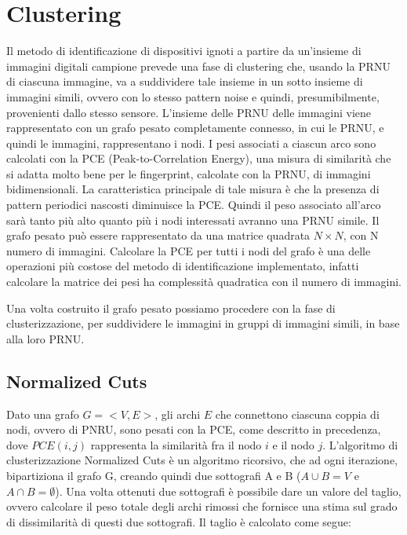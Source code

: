 \section{Clustering}

Il metodo di identificazione di dispositivi ignoti a partire da un'insieme di immagini digitali campione prevede una fase di clustering che, usando la PRNU di ciascuna immagine, va a suddividere tale insieme in un sotto insieme di immagini simili, ovvero con lo stesso pattern noise e quindi, presumibilmente, provenienti dallo stesso sensore.
L'insieme delle PRNU delle immagini viene rappresentato con un grafo pesato completamente connesso, in cui le PRNU, e quindi le immagini, rappresentano i nodi. I pesi associati a ciascun arco sono calcolati con la PCE (Peak-to-Correlation Energy), una misura di similarità che si adatta molto bene per le fingerprint, calcolate con la PRNU, di immagini bidimensionali. La caratteristica principale di tale misura è che la presenza di pattern periodici nascosti diminuisce la PCE. Quindi il peso associato all'arco sarà tanto più alto quanto più i nodi interessati avranno una PRNU simile. Il grafo pesato può essere rappresentato da una matrice quadrata $N\times N$, con N numero di immagini.
Calcolare la PCE per tutti i nodi del grafo è una delle operazioni più costose del metodo di identificazione implementato, infatti calcolare la matrice dei pesi ha complessità quadratica con il numero di immagini.

Una volta costruito il grafo pesato possiamo procedere con la fase di clusterizzazione, per suddividere le immagini in gruppi di immagini simili, in base alla loro PRNU.


\subsection{Normalized Cuts}

Dato una grafo $ G = <V, E> $, gli archi $E$ che connettono ciascuna coppia di nodi, ovvero di PNRU, sono pesati con la PCE, come descritto in precedenza, dove $PCE(i, j)$ rappresenta la similarità fra il nodo $i$ e il nodo $j$.
L'algoritmo di clusterizzazione Normalized Cuts è un algoritmo ricorsivo, che ad ogni iterazione, bipartiziona il grafo G, creando quindi due sottografi A e B ($A\cup B = V$ e $A\cap B = \emptyset$). Una volta ottenuti due sottografi è possibile dare un valore del taglio, ovvero calcolare il peso totale  degli archi rimossi che fornisce una stima sul grado di dissimilarità di questi due sottografi. Il taglio è calcolato come segue: 

